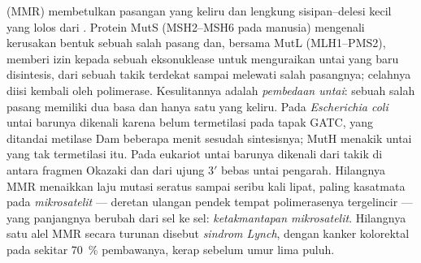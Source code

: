\begin{definition}\label{def:b3:dna-repair:mmr}
%
\emph{} (MMR) membetulkan pasangan yang keliru dan
lengkung sisipan--delesi kecil yang lolos dari . Protein MutS
(MSH2--MSH6 pada manusia) mengenali kerusakan bentuk sebuah salah pasang dan,
bersama MutL (MLH1--PMS2), memberi izin kepada sebuah eksonuklease untuk
menguraikan untai yang baru disintesis, dari sebuah takik terdekat sampai
melewati salah pasangnya; celahnya diisi kembali oleh polimerase. Kesulitannya
adalah \emph{pembedaan untai}: sebuah salah pasang memiliki dua basa dan hanya
satu yang keliru. Pada \emph{Escherichia coli} untai barunya dikenali karena
belum termetilasi pada tapak GATC, yang ditandai metilase Dam beberapa menit
sesudah sintesisnya; MutH menakik untai yang tak termetilasi itu. Pada
eukariot untai barunya dikenali dari takik di antara fragmen Okazaki dan dari
ujung 3$'$ bebas untai pengarah. Hilangnya MMR menaikkan laju mutasi seratus
sampai seribu kali lipat, paling kasatmata pada \emph{mikrosatelit} --- deretan
ulangan pendek tempat polimerasenya tergelincir --- yang panjangnya berubah
dari sel ke sel: \emph{ketakmantapan mikrosatelit}. Hilangnya satu alel MMR
secara turunan disebut \emph{sindrom Lynch}, dengan kanker kolorektal pada
sekitar \qty{70}{\%} pembawanya, kerap sebelum umur lima puluh.
\end{definition}

